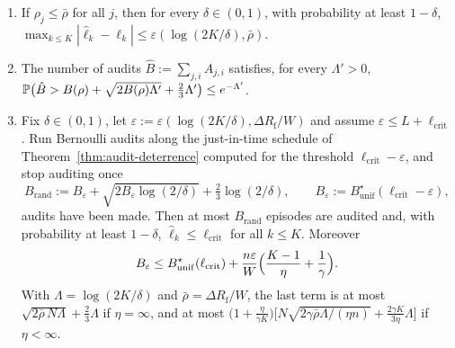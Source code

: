 \begin{theorem}\label{thm:audit-random}
\begin{enumerate}
\item[\textup{(a)}] If $\rho_j\le\bar\rho$ for all $j$, then for every
$\delta\in(0,1)$, with probability at least $1-\delta$,
$\max_{k\le K}|\hat\ell_k-\ell_k|\le\varepsilon(\log(2K/\delta),\bar\rho)$.
\item[\textup{(b)}] The number of audits $\hat B:=\sum_{j,i}A_{j,i}$ satisfies, for
every $\Lambda'>0$,
$\mathbb{P}\bigl(\hat B>B(\rho)+\sqrt{2B(\rho)\Lambda'}+\tfrac23\Lambda'\bigr)\le e^{-\Lambda'}$.
\item[\textup{(c)}] Fix $\delta\in(0,1)$, let
$\varepsilon:=\varepsilon(\log(2K/\delta),\Delta R_{\mathrm f}/W)$ and assume
$\varepsilon\le L+\ell_{\mathrm{crit}}$. Run Bernoulli audits along the
just-in-time schedule of Theorem~\ref{thm:audit-deterrence} computed for the
threshold $\ell_{\mathrm{crit}}-\varepsilon$, and stop auditing once
\[
  B_{\mathrm{rand}}:=B_\varepsilon+\sqrt{2B_\varepsilon\log(2/\delta)}+\tfrac23\log(2/\delta),
  \qquad B_\varepsilon:=B^\star_{\mathrm{unif}}(\ell_{\mathrm{crit}}-\varepsilon),
\]
audits have been made. Then at most $B_{\mathrm{rand}}$ episodes are audited
and, with probability at least $1-\delta$,
$\hat\ell_k\le\ell_{\mathrm{crit}}$ for all $k\le K$. Moreover
\begin{equation}\label{eq:audit-inflation}
  B_\varepsilon\le B^\star_{\mathrm{unif}}(\ell_{\mathrm{crit}})
  +\frac{n\varepsilon}{W}\Bigl(\frac{K-1}{\eta}+\frac1\gamma\Bigr).
\end{equation}
With $\Lambda=\log(2K/\delta)$ and $\bar\rho=\Delta R_{\mathrm f}/W$, the last term is at
most $\sqrt{2\bar\rho\,N\Lambda}+\tfrac23\Lambda$ if $\eta=\infty$, and at most
$\bigl(1+\tfrac{\eta}{\gamma K}\bigr)\bigl[N\sqrt{2\gamma\bar\rho\Lambda/(\eta n)}
+\tfrac{2\gamma K}{3\eta}\Lambda\bigr]$ if $\eta<\infty$.
\end{enumerate}
\end{theorem}

